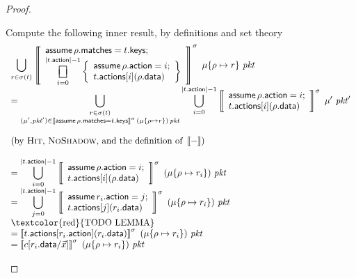 \documentclass{article}
\newcommand{\pkt}{\mathit{pkt}}
\newcommand{\denote}[1]{\left\llbracket#1\right\rrbracket}
\newcommand{\matches}{\mathsf{matches}}
\newcommand{\action}{\mathsf{action}}
\newcommand{\actions}{\mathsf{actions}}
\newcommand{\keys}{\mathsf{keys}}
\newcommand{\data}{\mathsf{data}}
\newcommand{\assume}{\mathop{\mathsf{assume}}}
\newcommand{\choiceop}{\rotatebox[origin=c]{90}{$\sqsubset\!\!\!\sqsupset$}}
\DeclareMathOperator*{\bigchoice}{\scalerel*{\choiceop}{\sum}}
\begin{document}
\begin{proof}
\begin{enumerate}[align=left]
\begin{enumerate}
      Compute the following inner result, by definitions and set theory
      \[
      \begin{array}{>{\displaystyle}ll}
      \bigcup_{r \in \sigma(t)}\denote{\begin{array}{>{\displaystyle}l}
          \assume \rho.\matches = t.\keys;\\
          \bigchoice_{i=0}^{|t.\action| -1}
          \left\{\begin{array}{l}
          \assume \rho.\action = i;\\
          t.\actions[i](\rho.\data)
          \end{array}\right\}
      \end{array}}^\sigma~\mu\{\rho \mapsto r\}~\pkt\\
      = \bigcup_{
        \substack{r \in \sigma(t) \\
          (\mu',\pkt') \in \denote{\assume \rho.\matches = t.\keys}^\sigma\,(\mu\{\rho \mapsto r\})\,\pkt}}
      \bigcup_{i=0}^{|t.\action| -1}\denote{
       \begin{array}{l}
          \assume \rho.\action = i;\\
          t.\actions[i](\rho.\data)
      \end{array}}^\sigma~\mu'~\pkt'

      \\\\
      (\textrm{by \textsc{Hit}, \textsc{NoShadow}, and the definition of }\denote{-}) \\
      \\
      = \bigcup_{i=0}^{|t.\action| -1}\denote{
       \begin{array}{l}
          \assume \rho.\action = i;\\
          t.\actions[i](\rho.\data)
      \end{array}}^\sigma~(\mu\{\rho \mapsto r_i\})~\pkt \\
      = \bigcup_{j=0}^{|t.\action| -1}\denote{
       \begin{array}{l}
          \assume r_i.\action = j;\\
          t.\actions[j](r_i.\data)
      \end{array}}^\sigma~(\mu\{\rho \mapsto r_i\})~\pkt \\
      \textrm{\textcolor{red}{TODO LEMMA}} \\
      = \denote{t.\actions[r_i.\action](r_i.\data)}^\sigma~(\mu\{\rho \mapsto r_i\})~\pkt \\
      = \denote{c[r_i.\data/\vec x]}^\sigma~(\mu\{\rho \mapsto r_i\})~\pkt \\
      \end{array}\]


\end{enumerate}
\end{enumerate}
\end{proof}
\end{document}

